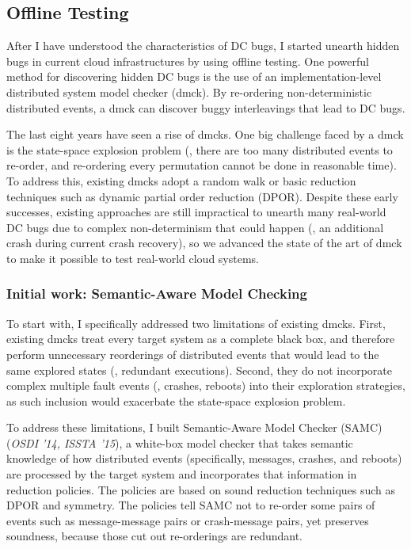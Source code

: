\documentclass[11pt]{article}
\begin{document}
\subsection{Offline Testing}

After I have understood the characteristics of DC bugs, I started unearth hidden
bugs in current cloud infrastructures by using offline testing. One powerful
method for discovering hidden DC bugs is the use of an implementation-level
distributed system model checker (dmck). By re-ordering non-deterministic
distributed events, a dmck can discover buggy interleavings that lead to DC
bugs.

The last eight years have seen a rise of dmcks. One big challenge faced by a
dmck is the state-space explosion problem (\ie, there are too many distributed
events to re-order, and re-ordering every permutation cannot be done in
reasonable time). To address this, existing dmcks adopt a random walk or basic
reduction techniques such as dynamic partial order reduction (DPOR). Despite
these early successes, existing approaches are still impractical to unearth many
real-world DC bugs due to complex non-determinism that could happen (\eg, an
additional crash during current crash recovery), so we advanced the state of the
art of dmck to make it possible to test real-world cloud systems.

\subsubsection*{Initial work: Semantic-Aware Model Checking} 

To start with, I specifically addressed two limitations of existing dmcks.
First, existing dmcks treat every target system as a complete black box, and
therefore perform unnecessary reorderings of distributed events that would lead
to the same explored states (\ie, redundant executions). Second, they do not
incorporate complex multiple fault events (\eg, crashes, reboots) into their
exploration strategies, as such inclusion would exacerbate the state-space
explosion problem.

To address these limitations, I built Semantic-Aware Model Checker (SAMC)
(\textit{OSDI '14, ISSTA '15}), a white-box model checker that takes semantic
knowledge of how distributed events (specifically, messages, crashes, and
reboots) are processed by the target system and incorporates that information in
reduction policies. The policies are based on sound reduction techniques such as
DPOR and symmetry. The policies tell SAMC not to re-order some pairs of events
such as message-message pairs or crash-message pairs, yet preserves soundness,
because those cut out re-orderings are redundant.
\end{document}
